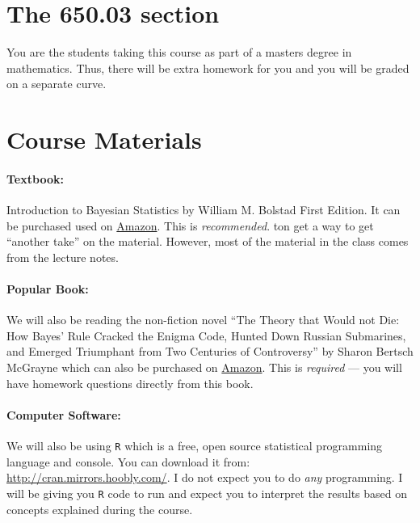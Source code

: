 \documentclass[12pt]{article}
\newcommand{\qu}[1]{``#1''}
\begin{document}
\section*{The 650.03 section}

You are the students taking this course as part of a masters degree in mathematics. Thus, there will be extra homework for you and you will be graded on a separate curve.

\section*{Course Materials}

\paragraph{Textbook:} Introduction to Bayesian Statistics by William M. Bolstad First Edition. It can be purchased used on \href{http://www.amazon.com/gp/offer-listing/0471270202/ref=sr_1_2_twi_1_har_olp?ie=UTF8&qid=1433515305&sr=8-2&keywords=introduction+to+bayesian+statistics+bolstad}{Amazon}. This is \textit{recommended}. ton get a way to get ``another take'' on the material. However, most of the material in the class comes from the lecture notes.  %

\paragraph{Popular Book:} We will also be reading the non-fiction novel \qu{The Theory that Would not Die: How Bayes' Rule Cracked the Enigma Code, Hunted Down Russian Submarines, and Emerged Triumphant from Two Centuries of Controversy} by Sharon Bertsch McGrayne which can also be purchased on \href{http://www.amazon.com/Theory-That-Would-Not-Die/dp/0300188226/ref=sr_1_1?ie=UTF8&qid=1454261896&sr=8-1&keywords=The+Theory+that+Would+not+Die}{Amazon}. This is \textit{required} --- you will have homework questions directly from this book.

\paragraph{Computer Software:} We will also be using \texttt{R} which is a free, open source statistical programming language and console. You can download it from: \url{http://cran.mirrors.hoobly.com/}. I do not expect you to do \textit{any} programming. I will be giving you \texttt{R} code to run and expect you to interpret the results based on concepts explained during the course.
\end{document}
